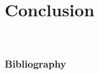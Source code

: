\documentclass[A4,svgnames,9pt,aspectratio=169]{beamer}
\begin{document}
\section{Conclusion}


\
\begin{frame}
\frametitle{Bibliography}
\printbibliography
\nocite{*}
\end{frame}







\renewcommand{\thankyou}{Thank You.}
\frame{\merci}

\end{document}

